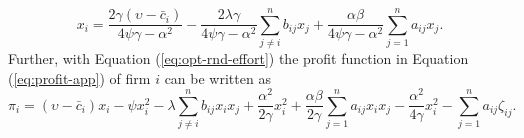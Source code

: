 \begin{equation}
x_i = \frac{2 \gamma (\upsilon - \bar{c}_i)} {4 \psi \gamma-\alpha^2} - \frac{2 \lambda \gamma} {4 \psi \gamma-\alpha^2} \sum_{j \ne i}^n b_{ij} x_j +
\frac{\alpha \beta} {4 \psi \gamma-\alpha^2} \sum_{j=1}^n a_{ij} x_j.
\label{eq:output-x-br-app}
\end{equation}
Further, with Equation (\ref{eq:opt-rnd-effort}) the profit function in Equation (\ref{eq:profit-app}) of firm $i$ can be written as
\begin{equation*}
\pi_i = (\upsilon- \bar{c}_i)  x_i - \psi x_i^2 - \lambda \sum_{j \ne i}^n b_{ij} x_i x_j + \frac{\alpha^2}{2 \gamma} x_i^2 +
 \frac{\alpha \beta}{2 \gamma}   \sum_{j=1}^n a_{ij} x_i x_j - \frac{\alpha^2}{4 \gamma} x_i^2 - \sum_{j=1}^n a_{ij}\zeta_{ij}.
\end{equation*}
